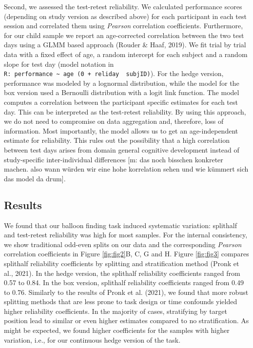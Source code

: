 \documentclass[
  man,floatsintext]{apa6}
\begin{document}
Second, we assessed the test-retest reliability. We calculated performance scores (depending on study version as described above) for each participant in each test session and correlated them using \emph{Pearson} correlation coefficients. Furthermore, for our child sample we report an age-corrected correlation between the two test days using a GLMM based approach (Rouder \& Haaf, 2019). We fit trial by trial data with a fixed effect of age, a random intercept for each subject and a random slope for test day (model notation in \texttt{R:\ performance\ \textasciitilde{}\ age\ (0\ +\ reliday\ \textbar{}\ subjID)}). For the hedge version, performance was modeled by a lognormal distribution, while the model for the box version used a Bernoulli distribution with a logit link function. The model computes a correlation between the participant specific estimates for each test day. This can be interpreted as the test-retest reliability. By using this approach, we do not need to compromise on data aggregation and, therefore, loss of information. Most importantly, the model allows us to get an age-independent estimate for reliability. This rules out the possibility that a high correlation between test days arises from domain general cognitive development instead of study-specific inter-individual differences {[}m: das noch bisschen konkreter machen. also wann würden wir eine hohe korrelation sehen und wie kümmert sich das model da drum{]}.

\hypertarget{results-1}{%
\subsection{Results}\label{results-1}}

We found that our balloon finding task induced systematic variation: splithalf and test-retest reliability was high for most samples. For the internal consistency, we show traditional odd-even splits on our data and the corresponding \emph{Pearson} correlation coefficients in Figure \ref{fig:fig2}B, C, G and H. Figure \ref{fig:fig3} compares splithalf reliability coefficients by splitting and stratification method (Pronk et al., 2021).
In the hedge version, the splithalf reliability coefficients ranged from 0.57 to 0.84. In the box version, splithalf reliability coefficients ranged from 0.49 to 0.76.
Similarly to the results of Pronk et al. (2021), we found that more robust splitting methods that are less prone to task design or time confounds yielded higher reliability coefficients. In the majority of cases, stratifying by target position lead to similar or even higher estimates compared to no stratification. As might be expected, we found higher coefficients for the samples with higher variation, i.e., for our continuous hedge version of the task.
\end{document}
